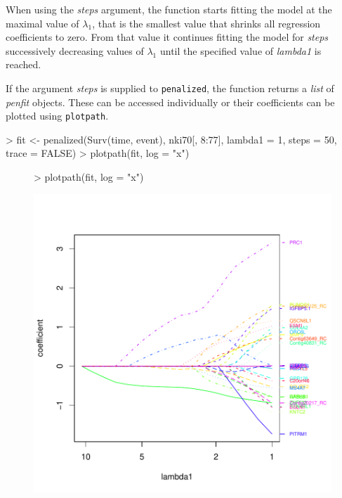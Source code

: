 \documentclass[a4paper]{article}
\newcommand{\Rfunction}[1]{{\texttt{#1}}}
\newcommand{\Rclass}[1]{{\textit{#1}}}
\newcommand{\Rfunarg}[1]{{\textit{#1}}}
\begin{document}
When using the \Rfunarg{steps} argument, the function starts fitting the model at the maximal value of $\lambda_1$, that is the smallest value that shrinks all regression coefficients to zero. From that value it continues fitting the model for \Rfunarg{steps} successively decreasing values of $\lambda_1$ until the specified value of \Rfunarg{lambda1} is reached.

If the argument \Rfunarg{steps} is supplied to \Rfunction{penalized}, the function returns a \Rclass{list} of \Rclass{penfit} objects. These can be accessed individually or their coefficients can be plotted using \Rfunction{plotpath}.

\begin{Schunk}
\begin{Sinput}
> fit <- penalized(Surv(time, event), nki70[, 8:77], lambda1 = 1, 
      steps = 50, trace = FALSE)
> plotpath(fit, log = "x")
\end{Sinput}
\end{Schunk}

\begin{figure}
\begin{Schunk}
\begin{Sinput}
> plotpath(fit, log = "x")
\end{Sinput}
\end{Schunk}
\includegraphics{penalized-stepsplot}
\end{figure}
\end{document}
